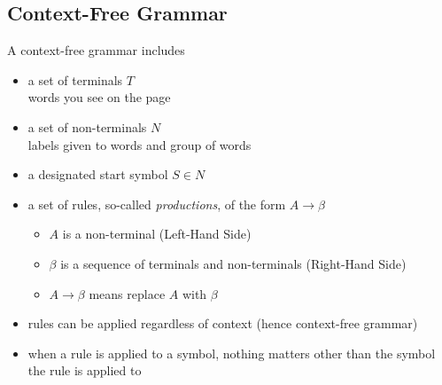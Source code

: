 \documentclass[11pt]{article}
\begin{document}
\subsection{Context-Free Grammar}
A context-free grammar includes
\begin{itemize}
	\item a set of terminals $T$\\
	words you see on the page
	\item a set of non-terminals $N$\\
	labels given to words and group of words
	\item a designated start symbol $S\in N$
	\item a set of rules, so-called \emph{productions}, of the form $A\rightarrow\beta$
	\begin{itemize}
		\item $A$ is a non-terminal (Left-Hand Side)
		\item $\beta$ is a sequence of terminals and non-terminals (Right-Hand Side)
		\item $A\rightarrow\beta$ means {\color{red} replace $A$ with $\beta$}
	\end{itemize}
	\item rules can be applied regardless of context (hence context-free grammar)
	\item when a rule is applied to a symbol, nothing matters other than the symbol the rule is applied to
\end{itemize}
\end{document}
